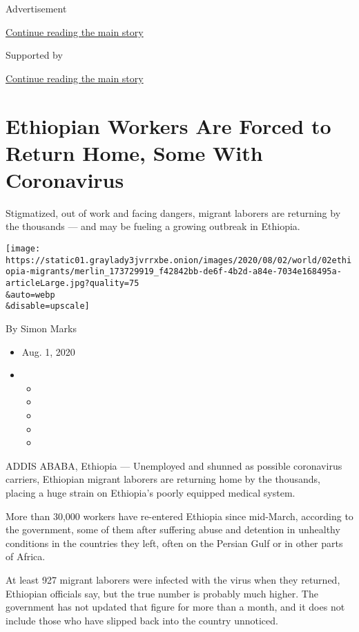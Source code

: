 Advertisement

\protect\hyperlink{after-top}{Continue reading the main story}

Supported by

\protect\hyperlink{after-sponsor}{Continue reading the main story}

\hypertarget{ethiopian-workers-are-forced-to-return-home-some-with-coronavirus}{%
\section{Ethiopian Workers Are Forced to Return Home, Some With
Coronavirus}\label{ethiopian-workers-are-forced-to-return-home-some-with-coronavirus}}

Stigmatized, out of work and facing dangers, migrant laborers are
returning by the thousands --- and may be fueling a growing outbreak in
Ethiopia.

\texttt{[image: https://static01.graylady3jvrrxbe.onion/images/2020/08/02/world/02ethiopia-migrants/merlin\_173729919\_f42842bb-de6f-4b2d-a84e-7034e168495a-articleLarge.jpg?quality=75\\\&auto=webp\\\&disable=upscale]}

By Simon Marks

\begin{itemize}
\item
  Aug. 1, 2020
\item
  \begin{itemize}
  \item
  \item
  \item
  \item
  \item
  \end{itemize}
\end{itemize}

ADDIS ABABA, Ethiopia --- Unemployed and shunned as possible coronavirus
carriers, Ethiopian migrant laborers are returning home by the
thousands, placing a huge strain on Ethiopia's poorly equipped medical
system.

More than 30,000 workers have re-entered Ethiopia since mid-March,
according to the government, some of them after suffering abuse and
detention in unhealthy conditions in the countries they left, often on
the Persian Gulf or in other parts of Africa.

At least 927 migrant laborers were infected with the virus when they
returned, Ethiopian officials say, but the true number is probably much
higher. The government has not updated that figure for more than a
month, and it does not include those who have slipped back into the
country unnoticed.

